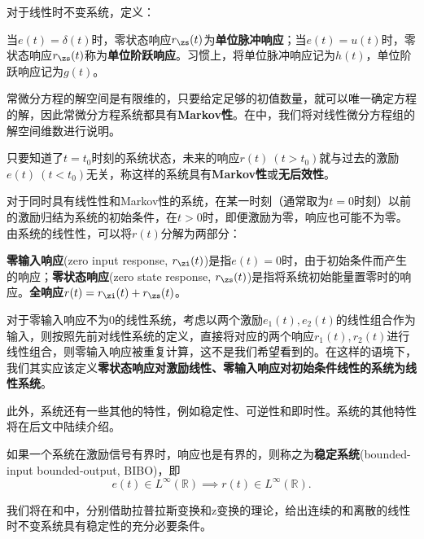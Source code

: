 对于线性时不变系统，定义：

\begin{definition}[单位脉冲响应与单位阶跃响应]
    \label{def:unit_immpulse_response}
    当$e(t)=\delta(t)$时，零状态响应$r_{\zs}(t)$为\textbf{单位脉冲响应}；当$e(t)=u(t)$时，零状态响应$r_{\zs}(t)$称为\textbf{单位阶跃响应}。习惯上，将单位脉冲响应记为$h(t)$，单位阶跃响应记为$g(t)$。
\end{definition}

常微分方程的解空间是有限维的，只要给定足够的初值数量，就可以唯一确定方程的解，因此常微分方程系统都具有\textbf{Markov性}。在中，我们将对线性微分方程组的解空间维数进行说明。

\begin{definition}[Markov性]
    \label{def:system_markov}
    只要知道了$t=t_0$时刻的系统状态，未来的响应$r(t)\ (t>t_0)$就与过去的激励$e(t)\ (t<t_0)$无关，称这样的系统具有\textbf{Markov性}或\textbf{无后效性}。
\end{definition}

对于同时具有线性性和Markov性的系统，在某一时刻（通常取为$t=0$时刻）以前的激励归结为系统的初始条件，在$t>0$时，即便激励为零，响应也可能不为零。由系统的线性性，可以将$r(t)$分解为两部分：
\begin{definition}[零输入响应与零状态响应]
    \label{def:zir_zsr}
    \textbf{零输入响应}(zero input response, $r_{\zi}(t)$)是指$e(t)=0$时，由于初始条件而产生的响应；\textbf{零状态响应}(zero state response, $r_{\zs}(t)$)是指将系统初始能量置零时的响应。\textbf{全响应}$r(t)=r_{\zi}(t)+r_{\zs}(t)$。
\end{definition}
对于零输入响应不为$0$的线性系统，考虑以两个激励$e_1(t),e_2(t)$的线性组合作为输入，则按照先前对线性系统的定义，直接将对应的两个响应$r_1(t),r_2(t)$进行线性组合，则零输入响应被重复计算，这不是我们希望看到的。在这样的语境下，我们其实应该定义\textbf{零状态响应对激励线性、零输入响应对初始条件线性的系统为线性系统}。

此外，系统还有一些其他的特性，例如稳定性、可逆性和即时性。系统的其他特性将在后文中陆续介绍。

\begin{definition}[稳定性]
    \label{def:system_stability}
    如果一个系统在激励信号有界时，响应也是有界的，则称之为\textbf{稳定系统}(bounded-input bounded-output, BIBO)，即
    \begin{equation}
        e(t)\in L^\infty(\mathbb{R})\implies r(t)\in L^\infty(\mathbb{R}).
    \end{equation}
\end{definition}
我们将在和中，分别借助拉普拉斯变换和z变换的理论，给出连续的和离散的线性时不变系统具有稳定性的充分必要条件。

